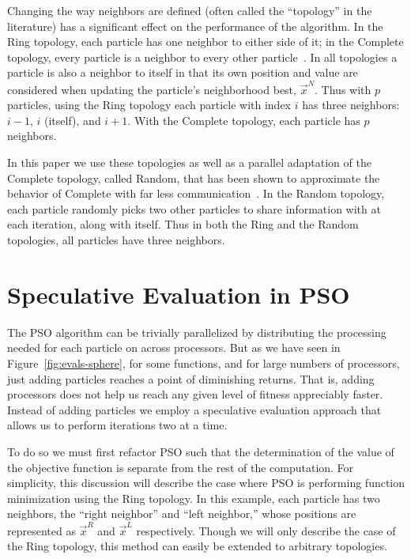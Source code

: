 \documentclass[journal,letterpaper]{IEEEtran}
\newcommand{\fig}[1]{Figure~\ref{fig:#1}}
\providecommand{\neigh}{\ensuremath{N}}
\providecommand{\leftind}{\ensuremath{L}}
\providecommand{\rightind}{\ensuremath{R}}
\providecommand{\nbest}{\ensuremath{\Vec{x}^\neigh}}
\providecommand{\leftn}{\ensuremath{\Vec{x}^\leftind}}
\providecommand{\rightn}{\ensuremath{\Vec{x}^\rightind}}
\begin{document}
Changing the way neighbors are defined (often called the ``topology'' in the
literature) has a significant effect on the performance of the algorithm.  In
the Ring topology, each particle has one neighbor to either side of it; in the
Complete topology, every particle is a neighbor to every other
particle~\cite{bratton-2007-defining-a-standard-for-pso}.  In all topologies a
particle is also a neighbor to itself in that its own position and value are
considered when updating the particle's neighborhood best, $\nbest$.  Thus with
$p$ particles, using the Ring topology each particle with index $i$ has three
neighbors: $i-1$, $i$ (itself), and $i+1$.  With the Complete topology, each
particle has $p$ neighbors.

In this paper we use these topologies as well as a parallel adaptation of the
Complete topology, called Random, that has been shown to approximate the
behavior of Complete with far less
communication~\cite{mcnabb-2009-large-particle-swarms}.  In the Random
topology, each particle randomly picks two other particles to share information
with at each iteration, along with itself.  Thus in both the Ring and the
Random topologies, all particles have three neighbors.

\section{Speculative Evaluation in PSO}
\label{sec:sepso}

The PSO algorithm can be trivially parallelized by distributing the processing
needed for each particle on across processors.  But as we have seen in
\fig{evals-sphere}, for some functions, and for large numbers of
processors, just adding particles reaches a point of diminishing returns.
That is, adding processors does not help us reach any given level of fitness
appreciably faster.  Instead of adding particles we employ a speculative
evaluation approach that allows us to perform iterations two at a time.

To do so we must first refactor PSO such that the determination of the value
of the objective function is separate from the rest of the computation.  For
simplicity, this discussion will describe the case where PSO is performing
function minimization using the Ring topology.  In this example, each particle
has two neighbors, the ``right neighbor'' and ``left neighbor,'' whose
positions are represented as $\rightn$ and $\leftn$ respectively.  Though we
will only describe the case of the Ring topology, this method can easily be
extended to arbitrary topologies.
\end{document}
